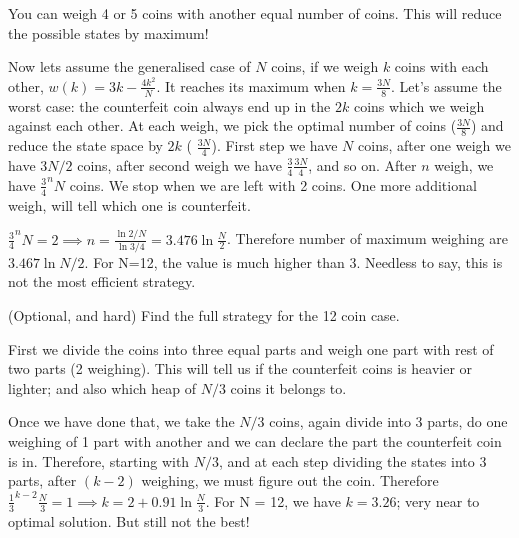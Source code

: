 \documentclass[10pt,answers]{exam}
\begin{document}
\begin{questions}
\begin{parts}
\begin{solution}
        You can weigh 4 or 5 coins with another equal number of coins. This will
        reduce the possible states by maximum! 

        Now lets assume the generalised case of $N$ coins, if we weigh $k$ coins with
        each other, \(w(k) = 3k - \frac{4k^2}{N}\). It reaches its maximum when \(k =
        \frac{3N}{8}\).  Let's assume the worst case: the counterfeit coin
        always end up in the $2k$ coins which we weigh against each other. At each
        weigh, we pick the optimal number of coins (\(\frac{3N}{8}\)) and reduce the
        state space by $2k$ ( \(\frac{3N}{4}\)). First step we have \(N\) coins, after
        one weigh we have \(3N/2\) coins, after second weigh we have
        \(\frac{3}{4}\frac{3N}{4}\), and so on. After \(n\) weigh, we have
        \(\frac{3}{4}^n N\) coins. We stop when we are left with 2 coins. One more
        additional weigh, will tell which one is counterfeit.

        \(\frac{3}{4}^n N = 2 \implies n = \frac{\ln{2/N}}{\ln{3/4}} = 3.476
        \ln{\frac{N}{2}}\).  Therefore number of maximum weighing are
        \(3.467\ln{N/2}\). For N=12, the value is much higher than 3. Needless to
        say, this is not the most efficient strategy.

    \end{solution}

    \bonuspart[15] (Optional, and hard) Find the full strategy for the 12 coin case.
    \begin{solution}
        First we divide the coins into three equal parts and weigh one part with
        rest of two parts (2 weighing). This will tell us if the counterfeit
        coins is heavier or lighter; and also which heap of $N/3$ coins it
        belongs to.

        Once we have done that, we take the $N/3$ coins, again divide into 3
        parts, do one weighing of 1 part with another and we can declare the
        part the counterfeit coin is in. Therefore, starting with $N/3$, and at
        each step dividing the states into 3 parts, after $(k-2)$ weighing, we
        must figure out the coin. Therefore
        \(\frac{1}{3}^{k-2} \frac{N}{3} = 1 \implies k = 2 + 0.91 \ln \frac{N}{3}\).
        For N = 12, we have \(k = 3.26\); very near to optimal solution. But
        still not the best!

    \end{solution}

\end{parts}



\end{questions}
\end{document}
